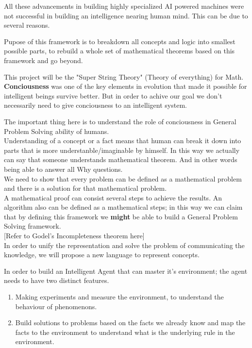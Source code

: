 \documentclass{article}
\begin{document}
All these advancements in building highly specialized AI powered machines were not successful in building an intelligence nearing human mind. This can be due to several reasons.


Pupose of this framework is to breakdown all concepts and logic into smallest possible parts, to rebuild a whole set of mathematical theorems based on this framework and go beyond.


This project will be the "Super String Theory" (Theory of everything) for Math.
\\

\textbf{Conciousness} was one of the key elements in evolution that made it possible for intelligent beings survive better. But in order to achive our goal we don't necessarily need to give conciousness to an intelligent system. 

The important thing here is to understand the role of conciousness in General Problem Solving ability of humans.
\\

Understanding of a concept or a fact means that human can break it down into parts that is more understanble/imaginable by himself. In this way we actually can say that someone understands mathematical theorem. And in other words being able to answer all Why questions.
\\

We need to show that every problem can be defined as a mathematical problem and there is a solution for that mathematical problem.\\

A mathematical proof can consist several steps to achieve the results. An algorithm also can be defined as a mathematical steps; in this way we can claim that by defining this framework we \textbf{might} be able to build a General Problem Solving framework.\\

[Refer to Godel's Incompleteness theorem here]\\


In order to unify the representation and solve the problem of communicating the knowledge, we will propose a new language to represent concepts.

In order to build an Intelligent Agent that can master it's environment; the agent needs to have two distinct features.




\begin{enumerate}
\item Making experiments and measure the environment, to understand the behaviour of phenomenons.
\item Build solutions to problems based on the facts we already know and map the facts to the environment to understand what is the underlying rule in the environment.
\end{enumerate}
\end{document}

